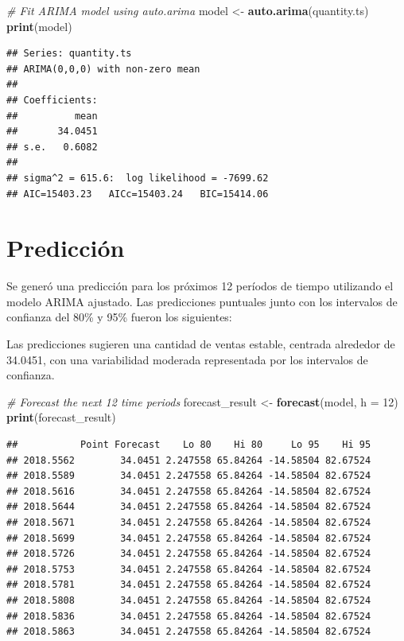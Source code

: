 \documentclass[
]{book}
\newenvironment{Shaded}{\begin{snugshade}}{\end{snugshade}}
\newcommand{\AttributeTok}[1]{\textcolor[rgb]{0.13,0.29,0.53}{#1}}
\newcommand{\CommentTok}[1]{\textcolor[rgb]{0.56,0.35,0.01}{\textit{#1}}}
\newcommand{\DecValTok}[1]{\textcolor[rgb]{0.00,0.00,0.81}{#1}}
\newcommand{\FunctionTok}[1]{\textcolor[rgb]{0.13,0.29,0.53}{\textbf{#1}}}
\newcommand{\NormalTok}[1]{#1}
\newcommand{\OtherTok}[1]{\textcolor[rgb]{0.56,0.35,0.01}{#1}}
\begin{document}
\begin{Shaded}
\begin{Highlighting}[]
\CommentTok{\# Fit ARIMA model using auto.arima}
\NormalTok{model }\OtherTok{\textless{}{-}} \FunctionTok{auto.arima}\NormalTok{(quantity.ts)}
\FunctionTok{print}\NormalTok{(model)}
\end{Highlighting}
\end{Shaded}

\begin{verbatim}
## Series: quantity.ts 
## ARIMA(0,0,0) with non-zero mean 
## 
## Coefficients:
##          mean
##       34.0451
## s.e.   0.6082
## 
## sigma^2 = 615.6:  log likelihood = -7699.62
## AIC=15403.23   AICc=15403.24   BIC=15414.06
\end{verbatim}

\section{Predicción}\label{predicciuxf3n-1}

Se generó una predicción para los próximos 12 períodos de tiempo utilizando el modelo ARIMA ajustado. Las predicciones puntuales junto con los intervalos de confianza del 80\% y 95\% fueron los siguientes:

Las predicciones sugieren una cantidad de ventas estable, centrada alrededor de 34.0451, con una variabilidad moderada representada por los intervalos de confianza.

\begin{Shaded}
\begin{Highlighting}[]
\CommentTok{\# Forecast the next 12 time periods}
\NormalTok{forecast\_result }\OtherTok{\textless{}{-}} \FunctionTok{forecast}\NormalTok{(model, }\AttributeTok{h =} \DecValTok{12}\NormalTok{)}
\FunctionTok{print}\NormalTok{(forecast\_result)}
\end{Highlighting}
\end{Shaded}

\begin{verbatim}
##           Point Forecast    Lo 80    Hi 80     Lo 95    Hi 95
## 2018.5562        34.0451 2.247558 65.84264 -14.58504 82.67524
## 2018.5589        34.0451 2.247558 65.84264 -14.58504 82.67524
## 2018.5616        34.0451 2.247558 65.84264 -14.58504 82.67524
## 2018.5644        34.0451 2.247558 65.84264 -14.58504 82.67524
## 2018.5671        34.0451 2.247558 65.84264 -14.58504 82.67524
## 2018.5699        34.0451 2.247558 65.84264 -14.58504 82.67524
## 2018.5726        34.0451 2.247558 65.84264 -14.58504 82.67524
## 2018.5753        34.0451 2.247558 65.84264 -14.58504 82.67524
## 2018.5781        34.0451 2.247558 65.84264 -14.58504 82.67524
## 2018.5808        34.0451 2.247558 65.84264 -14.58504 82.67524
## 2018.5836        34.0451 2.247558 65.84264 -14.58504 82.67524
## 2018.5863        34.0451 2.247558 65.84264 -14.58504 82.67524
\end{verbatim}
\end{document}
